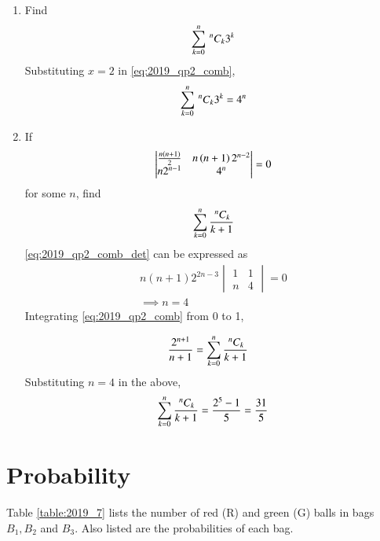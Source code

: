 \documentclass[journal,12pt,twocolumn]{IEEEtran}
\renewcommand\thesection{\arabic{section}}
\begin{document}
\begin{enumerate}[label=\thesection.\arabic*
,ref=\thesection.\theenumi]
\item Find 
\begin{align}
\label{eq:2019_qp2_comb_3k}
\sum_{k=0}^{n}\,^{n}C_{k}3^k
\end{align}
\solution Substituting $x=2$ in \eqref{eq:2019_qp2_comb},
\begin{align}
\label{eq:2019_qp2_comb_3k_sol}
\sum_{k=0}^{n}\,^{n}C_{k}3^k = 4^n
\end{align}
\item If
\begin{align}
\label{eq:2019_qp2_comb_det}
\begin{vmatrix}
\frac{n(n+1)}{2} & n\left(n+1\right)2^{n-2}
\\
n2^{n-1} & 4^n
\end{vmatrix} = 0
\end{align}
for some $n$, find 
\begin{align}
\label{eq:2019_qp2_comb_det_prob}
\sum_{k=0}^{n}\frac{\,^{n}C_{k}}{k+1}
\end{align}
%
\solution \eqref{eq:2019_qp2_comb_det} can be expressed as
\begin{align}
\label{eq:2019_qp2_comb_det_sol}
n(n+1)2^{2n-3}
\begin{vmatrix}
1 & 1
\\
n & 4
\end{vmatrix} = 0
\\
\implies n = 4
\end{align}
%
Integrating \eqref{eq:2019_qp2_comb} from 0 to 1,

\begin{align}
\label{eq:2019_qp2_comb_int}
\frac{2^{n+1}}{n+1}&=\sum_{k=0}^{n}\frac{\,^{n}C_{k}}{k+1}
\end{align}
%
Substituting $n=4$ in the above, 
\begin{align}
\label{eq:2019_qp2_comb_int_sol}
\sum_{k=0}^{n}\frac{\,^{n}C_{k}}{k+1}= \frac{2^{5}-1}{5} = \frac{31}{5}
\end{align}
\end{enumerate}
\section{Probability}
Table \ref{table:2019_7} lists the number of red (R) and green (G) balls in bags $B_1, B_2$ and $B_3$. Also listed are the probabilities of each bag.
\begin{table}[!h]
\centering
%

\caption{}
\label{table:2019_7}
\end{table}
\end{document}

